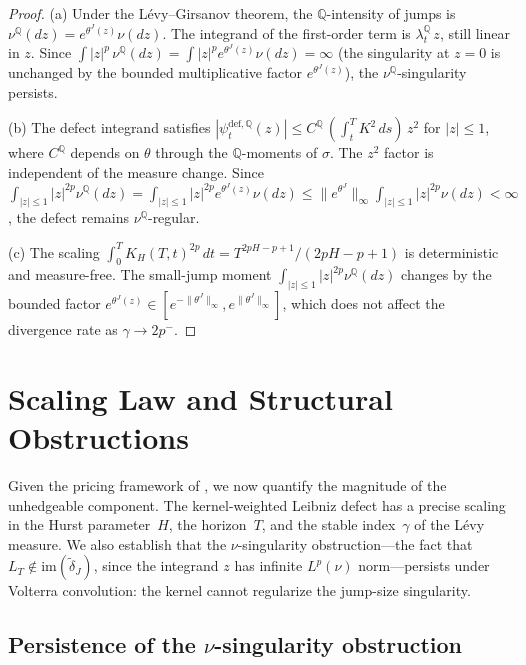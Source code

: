 \documentclass[11pt,a4paper]{article}
\theoremstyle{plain}
\theoremstyle{definition}
\theoremstyle{remark}
\newcommand{\QQ}{\mathbb{Q}}
\begin{document}
\begin{proof}
(a) Under the L\'evy--Girsanov theorem, the $\QQ$-intensity
of jumps is $\nu^\QQ(dz) = e^{\theta^J(z)}\nu(dz)$.  The
integrand of the first-order term is $\lambda_t^\QQ\,z$,
still linear in $z$.  Since $\int|z|^p\,\nu^\QQ(dz)
= \int|z|^p e^{\theta^J(z)}\nu(dz) = \infty$ (the
singularity at $z = 0$ is unchanged by the bounded
multiplicative factor $e^{\theta^J(z)}$), the
$\nu^\QQ$-singularity persists.

(b) The defect integrand satisfies
$|\psi_t^{\mathrm{def},\QQ}(z)|
\leq C^\QQ\,(\int_t^T K^2\,ds)\,z^2$ for $|z| \leq 1$,
where $C^\QQ$ depends on $\theta$ through the
$\QQ$-moments of $\sigma$.  The $z^2$ factor is independent
of the measure change.  Since
$\int_{|z|\leq 1}|z|^{2p}\nu^\QQ(dz)
= \int_{|z|\leq 1}|z|^{2p}e^{\theta^J(z)}\nu(dz)
\leq \|e^{\theta^J}\|_\infty\int_{|z|\leq 1}
|z|^{2p}\nu(dz) < \infty$, the defect remains
$\nu^\QQ$-regular.

(c) The scaling $\int_0^T K_H(T,t)^{2p}\,dt
= T^{2pH-p+1}/(2pH-p+1)$ is deterministic and measure-free.
The small-jump moment $\int_{|z|\leq 1}|z|^{2p}\nu^\QQ(dz)$
changes by the bounded factor
$e^{\theta^J(z)} \in [e^{-\|\theta^J\|_\infty},
e^{\|\theta^J\|_\infty}]$, which does not affect the
divergence rate as $\gamma \to 2p^-$.
\end{proof}



\section{Scaling Law and Structural Obstructions}\label{sec:scaling}

Given the pricing framework of , we now
quantify the magnitude of the unhedgeable component.  The
kernel-weighted Leibniz defect has a precise scaling in the
Hurst parameter~$H$, the horizon~$T$, and the stable
index~$\gamma$ of the L\'evy measure.  We also establish
that the $\nu$-singularity obstruction---the fact that
$L_T \notin \mathrm{im}(\widetilde{\delta}_J)$, since the
integrand $z$ has infinite $L^p(\nu)$ norm---persists
under Volterra convolution: the kernel cannot
regularize the jump-size singularity.

\subsection{Persistence of the $\nu$-singularity obstruction}
\end{document}
